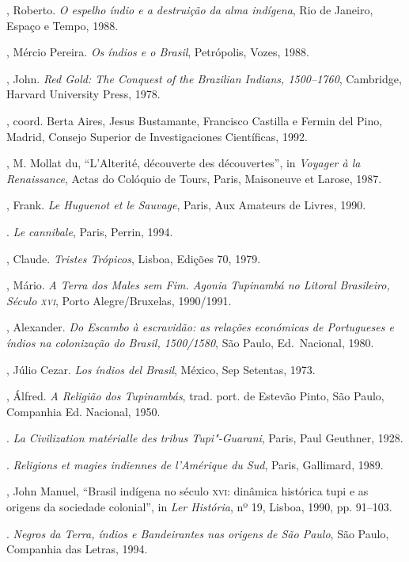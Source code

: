 \begin{bibliohedra}
, Roberto. \textit{O espelho índio e a destruição da alma
indígena}, Rio de Janeiro, Espaço e Tempo, 1988.

, Mércio Pereira. \textit{Os índios e o Brasil}, Petrópolis, Vozes, 1988.

, John. \textit{Red Gold: The Conquest of the Brazilian
Indians, 1500--1760}, Cambridge, Harvard University Press, 1978.

, coord. Berta Aires, Jesus Bustamante, Francisco
Castilla e Fermin del Pino, Madrid, Consejo Superior de
Investigaciones Científicas, 1992.

, M. Mollat du, ``L'Alterité, découverte des découvertes'', in
\textit{Voyager à la Renaissance}, Actas do Colóquio de Tours, Paris,
Maisoneuve et Larose, 1987.

, Frank. \textit{Le Huguenot et le Sauvage}, Paris, Aux
Amateurs de Livres, 1990.

\titidem. \textit{Le cannibale}, Paris, Perrin, 1994.

, Claude. \textit{Tristes Trópicos}, Lisboa, Edições 70,
1979.

, Mário. \textit{A Terra dos Males sem Fim. Agonia Tupinambá no
Litoral Brasileiro, Século \textsc{xvi}}, Porto Alegre/Bruxelas, 1990/1991.

, Alexander. \textit{Do Escambo à escravidão: as relações
económicas de Portugueses e índios na colonização do Brasil, 1500/1580}, 
São Paulo, Ed.~Nacional, 1980.

, Júlio Cezar. \textit{Los índios del Brasil}, México, Sep
Setentas, 1973.

, Álfred. \textit{A Religião dos Tupinambás}, trad. port. de
Estevão Pinto, São Paulo, Companhia Ed. Nacional, 1950.

\titidem. \textit{La Civilization matérialle des tribus
Tupi"-Guarani}, Paris, Paul Geuthner, 1928.

\titidem. \textit{Religions et magies indiennes de l'Amérique
du Sud}, Paris, Gallimard, 1989.

, John Manuel, ``Brasil indígena no século \textsc{xvi}: dinâmica
histórica tupi e as origens da sociedade colonial'', in \textit{Ler
História}, nº 19, Lisboa, 1990, pp. 91--103.

\titidem. \textit{Negros da Terra, índios e Bandeirantes
nas origens de São Paulo}, São Paulo, Companhia das Letras, 1994.


\end{bibliohedra}
